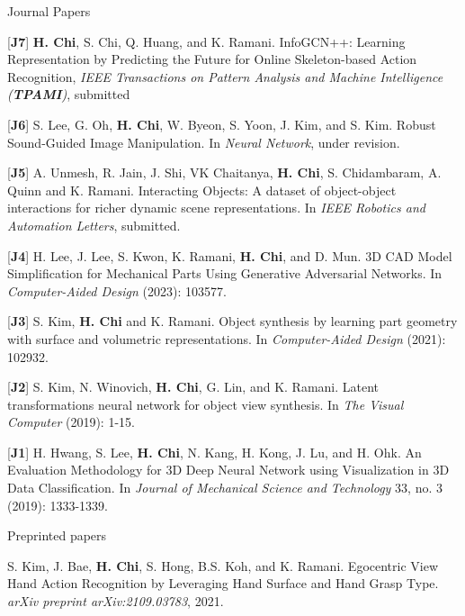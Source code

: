 \begin{cventries}
\cvpub
{Journal Papers} %
{ %
\begin{cvitems}
    \item {[\textbf{J7}] \textbf{H. Chi}, S. Chi, Q. Huang, and K. Ramani. InfoGCN++: Learning Representation by Predicting the Future for Online Skeleton-based Action Recognition, \textit{IEEE Transactions on Pattern Analysis and Machine Intelligence (\textbf{TPAMI})}, submitted}
    \item {[\textbf{J6}] S. Lee, G. Oh, \textbf{H. Chi}, W. Byeon, S. Yoon, J. Kim, and S. Kim. Robust Sound-Guided Image Manipulation. In \textit{Neural Network}, under revision.}
    \item {[\textbf{J5}] A. Unmesh,  R. Jain, J. Shi, VK Chaitanya, \textbf{H. Chi}, S. Chidambaram, A. Quinn and K. Ramani. Interacting Objects: A dataset of object-object interactions for richer dynamic scene representations. In \textit{IEEE Robotics and Automation Letters}, submitted.}
    \item {[\textbf{J4}] H. Lee, J. Lee, S. Kwon, K. Ramani, \textbf{H. Chi}, and D. Mun. 3D CAD Model Simplification for Mechanical Parts Using Generative Adversarial Networks. In \textit{Computer-Aided Design} (2023): 103577.}
    \item {[\textbf{J3}] S. Kim, \textbf{H. Chi} and K. Ramani. Object synthesis by learning part geometry with surface and volumetric representations. In \textit{Computer-Aided Design} (2021): 102932.}
    \item {[\textbf{J2}] S. Kim, N. Winovich, \textbf{H. Chi}, G. Lin, and K. Ramani. Latent transformations neural network for object view synthesis. In \textit{The Visual Computer} (2019): 1-15.}
    \item {[\textbf{J1}] H. Hwang, S. Lee, \textbf{H. Chi}, N. Kang, H. Kong, J. Lu, and H. Ohk. An Evaluation Methodology for 3D Deep Neural Network using Visualization in 3D Data Classification. In \textit{Journal of Mechanical Science and Technology} 33, no. 3 (2019): 1333-1339.}
\end{cvitems}
}

\cvpub
{Preprinted papers} %
{
\begin{cvitems}
    \item {S. Kim, J. Bae, \textbf{H. Chi}, S. Hong, B.S. Koh, and K. Ramani. Egocentric View Hand Action Recognition by Leveraging Hand Surface and Hand Grasp Type. \textit{arXiv preprint arXiv:2109.03783}, 2021. }
\end{cvitems}
}



\end{cventries}
